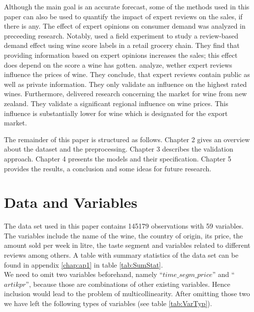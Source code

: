 \documentclass[11pt,]{article}
\begin{document}
Although the main goal is an accurate forecast, some of the methods used
in this paper can also be used to quantify the impact of expert reviews
on the sales, if there is any. The effect of expert opinions on consumer
demand was analyzed in preceeding research. Notably,
\textcite[][p. 1289]{Hilger2011} used a field experiment to study a
review-based demand effect using wine score labels in a retail grocery
chain. They find that providing information based on expert opinions
increases the sales; this effect does depend on the score a wine has
gotten. \textcite[][p. 293]{Ashenfelter2013} analyze, wether expert
reviews influence the prices of wine. They conclude, that expert reviews
contain public as well as private information. They only validate an
influence on the highest rated wines. Furthermore,
\textcite[][p. 182f.]{Bicknell2012} delivered research concerning the
market for wine from new zealand. They validate a significant regional
influence on wine prices. This influence is substantially lower for wine
which is designated for the export market.

The remainder of this paper is structured as follows. Chapter 2 gives an
overview about the dataset and the preprocessing. Chapter 3 describes
the validation approach. Chapter 4 presents the models and their
specification. Chapter 5 provides the results, a conclusion and some
ideas for future research.

\hypertarget{data-and-variables}{%
\section{\texorpdfstring{Data and Variables
\label{chap:data}}{Data and Variables }}\label{data-and-variables}}

The data set used in this paper contains 145179 observations with 59
variables. The variables include the name of the wine, the country of
origin, its price, the amount sold per week in litre, the taste segment
and variables related to different reviews among others. A table with
summary statistics of the data set can be found in appendix
\ref{chap:ap1} in table \ref{tab:SumStat}.\\
We need to omit two variables beforehand, namely
\enquote{\(time\_segm\_price\)} and \enquote{\(artikpr\)}, because those
are combinations of other existing variables. Hence inclusion would lead
to the problem of multicollinearity. After omitting those two we have
left the following types of variables (see table \ref{tab:VarTyp}).
\end{document}
